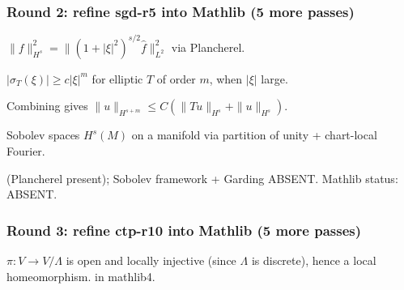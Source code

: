 \subsubsection*{Round 2: refine sgd-r5 into Mathlib (5 more passes)}

\begin{lemma}
\label{lem:sgd-r6}
$\|f\|_{H^{s}}^{2} = \|(1+|\xi|^{2})^{s/2}\hat f\|_{L^{2}}^{2}$ via Plancherel.
\leanok
\end{lemma}

\begin{lemma}
\label{lem:sgd-r7}
$|\sigma_{T}(\xi)| \geq c|\xi|^{m}$ for elliptic $T$ of order $m$, when $|\xi|$ large.
\leanok
\end{lemma}

\begin{lemma}
\label{lem:sgd-r8}
Combining gives $\|u\|_{H^{s+m}} \leq C(\|Tu\|_{H^{s}} + \|u\|_{H^{s}})$.
\leanok
\end{lemma}

\begin{lemma}
\label{lem:sgd-r9}
Sobolev spaces $H^{s}(M)$ on a manifold via partition of unity + chart-local Fourier.
\leanok
\end{lemma}

\begin{lemma}
\label{lem:sgd-r10}
 (Plancherel present); Sobolev framework + Garding ABSENT.  Mathlib status: ABSENT.
\leanok
\end{lemma}

\subsubsection*{Round 3: refine ctp-r10 into Mathlib (5 more passes)}

\begin{lemma}
\label{lem:ctp-r11}
$\pi : V \to V/\Lambda$ is open and locally injective (since $\Lambda$ is discrete), hence a local homeomorphism.   in mathlib4.
\leanok\mathlibok
\end{lemma}

